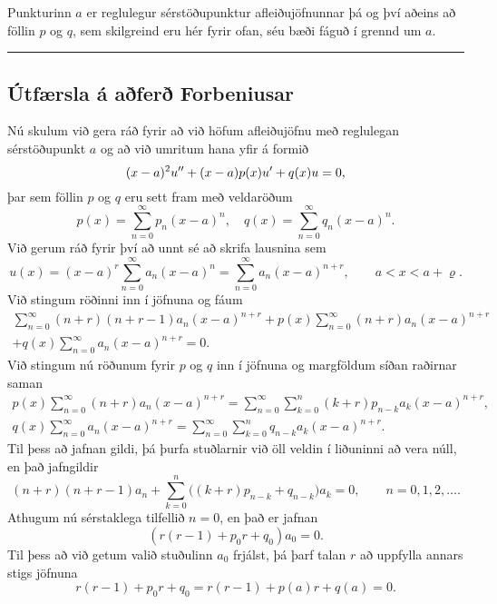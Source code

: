 Punkturinn $a$ er reglulegur sérstöðupunktur afleiðujöfnunnar þá og
því aðeins að föllin $p$ og $q$, sem skilgreind eru hér fyrir ofan, 
séu bæði fáguð í grennd um $a$.

\bigskip\hrule\bigskip

\subsection*{Útfærsla á aðferð Forbeniusar}

Nú skulum við gera ráð fyrir að við höfum afleiðujöfnu með reglulegan
sérstöðupunkt $a$ og að við umritum hana yfir á formið
 $$(x-a)^2u{\sp{\prime\prime}}+(x-a)p(x)u{\sp{\prime}}+q(x)u=0,
 $$
þar sem föllin $p$ og $q$ eru sett fram með veldaröðum
 $$p(x)= \sum_{n=0}^\infty p_n(x-a)^n, \quad
q(x)= \sum_{n=0}^\infty q_n(x-a)^n.
 $$
Við  gerum ráð fyrir því að unnt sé að skrifa lausnina sem 
\begin{equation*}u(x)= (x-a)^r\sum_{n=0}^\infty a_n(x-a)^n=
\sum_{n=0}^\infty a_n(x-a)^{n+r}, \qquad a<x<a+\varrho.\label{3.4.4}
\end{equation*}
Við stingum röðinni inn í jöfnuna og fáum 
\begin{multline*}
\sum_{n=0}^\infty (n+r)(n+r-1)a_n(x-a)^{n+r} +
p(x)\sum_{n=0}^\infty (n+r)a_n(x-a)^{n+r} \\
+ q(x)\sum_{n=0}^\infty a_n(x-a)^{n+r} = 0.
\end{multline*}
Við stingum nú röðunum fyrir $p$ og $q$ inn í jöfnuna og 
margföldum síðan raðirnar saman 
\begin{gather*}
p(x)\sum_{n=0}^\infty (n+r)a_n(x-a)^{n+r}= \sum_{n=0}^\infty
\sum_{k=0}^n(k+r)p_{n-k}a_{k} (x-a)^{n+r},\\
q(x)\sum_{n=0}^\infty a_n(x-a)^{n+r}= \sum_{n=0}^\infty
\sum_{k=0}^n q_{n-k}a_{k} (x-a)^{n+r}.
\end{gather*}
Til þess að jafnan gildi, þá þurfa stuðlarnir við öll veldin í
liðuninni að vera núll, en það jafngildir
 \begin{equation*}(n+r)(n+r-1)a_n+\sum_{k=0}^n\big((k+r)p_{n-k}+q_{n-k}\big)a_k=0,
\qquad n=0,1,2,\dots.
\label{3.4.5}
 \end{equation*}
Athugum nú sérstaklega tilfellið $n=0$, en það er jafnan
 $$(r(r-1)+p_0r+q_0)a_0=0.
 $$
Til þess að við getum valið stuðulinn $a_0$ frjálst, þá þarf talan
$r$ að uppfylla annars stigs jöfnuna
 \begin{equation*}r(r-1)+p_0r+q_0=r(r-1)+ p(a)r+q(a)=0.
\label{3.4.6}
 \end{equation*}
